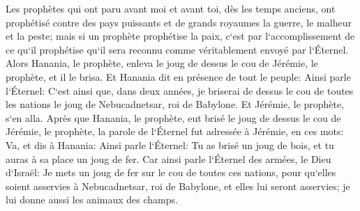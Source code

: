 \verse Les prophètes qui ont paru avant moi et avant toi, dès les temps anciens, ont prophétisé contre des pays puissants et de grands royaumes la guerre, le malheur et la peste; 
\verse mais si un prophète prophétise la paix, c`est par l`accomplissement de ce qu`il prophétise qu`il sera reconnu comme véritablement envoyé par l`Éternel. 
\verse Alors Hanania, le prophète, enleva le joug de dessus le cou de Jérémie, le prophète, et il le brisa. 
\verse Et Hanania dit en présence de tout le peuple: Ainsi parle l`Éternel: C`est ainsi que, dans deux années, je briserai de dessus le cou de toutes les nations le joug de Nebucadnetsar, roi de Babylone. Et Jérémie, le prophète, s`en alla. 
\verse Après que Hanania, le prophète, eut brisé le joug de dessus le cou de Jérémie, le prophète, la parole de l`Éternel fut adressée à Jérémie, en ces mots: 
\verse Va, et dis à Hanania: Ainsi parle l`Éternel: Tu as brisé un joug de bois, et tu auras à sa place un joug de fer. 
\verse Car ainsi parle l`Éternel des armées, le Dieu d`Israël: Je mets un joug de fer sur le cou de toutes ces nations, pour qu`elles soient asservies à Nebucadnetsar, roi de Babylone, et elles lui seront asservies; je lui donne aussi les animaux des champs. 
